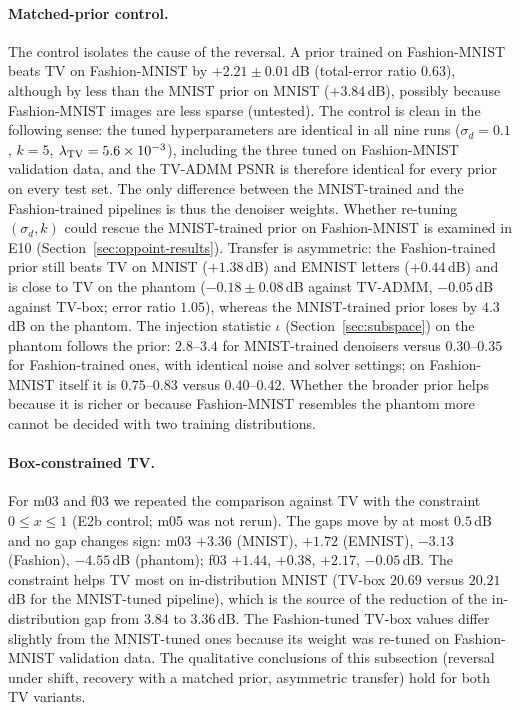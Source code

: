 \paragraph{Matched-prior control.} The control isolates the cause of the reversal. A prior trained on Fashion-MNIST beats TV on
Fashion-MNIST by $+2.21\pm0.01$\,dB (total-error ratio $0.63$), although by less than the MNIST prior on MNIST
($+3.84$\,dB), possibly because Fashion-MNIST images are less sparse (untested). The control is clean in the following sense: the
tuned hyperparameters are identical in all nine runs ($\sigma_d=0.1$, $k=5$, $\lambda_{\rm TV}=5.6\times10^{-3}$), including the three
tuned on Fashion-MNIST validation data, and the TV-ADMM PSNR is therefore identical for every prior on every test set. The
only difference between the MNIST-trained and the Fashion-trained pipelines is thus the denoiser weights. Whether re-tuning $(\sigma_d,k)$ could rescue the MNIST-trained prior on Fashion-MNIST is examined in E10 (Section~\ref{sec:oppoint-results}).
Transfer is asymmetric:
the Fashion-trained prior still beats TV on MNIST ($+1.38$\,dB) and EMNIST letters ($+0.44$\,dB) and is close to TV
on the phantom ($-0.18\pm0.08$\,dB against TV-ADMM, $-0.05$\,dB against TV-box; error ratio $1.05$), whereas the MNIST-trained prior loses by $4.3$\,dB on the phantom.
The injection statistic $\iota$ (Section~\ref{sec:subspace}) on the phantom follows the prior: $2.8$--$3.4$ for MNIST-trained denoisers versus
$0.30$--$0.35$ for Fashion-trained ones, with identical noise and solver settings; on Fashion-MNIST itself it is $0.75$--$0.83$
versus $0.40$--$0.42$. Whether the broader prior helps because it is richer or because Fashion-MNIST resembles the phantom
more cannot be decided with two training distributions.

\paragraph{Box-constrained TV.} For m03 and f03 we repeated the comparison against TV with the constraint $0\le x\le1$
(E2b control; m05 was not rerun). The gaps move by at most $0.5$\,dB and no gap changes sign: m03 $+3.36$ (MNIST), $+1.72$ (EMNIST), $-3.13$ (Fashion), $-4.55$\,dB (phantom); f03 $+1.44$, $+0.38$, $+2.17$,
$-0.05$\,dB. The constraint helps TV most on in-distribution MNIST (TV-box $20.69$ versus $20.21$\,dB for the MNIST-tuned
pipeline), which is the source of the reduction of the in-distribution gap from $3.84$ to $3.36$\,dB. The Fashion-tuned TV-box values differ slightly from the
MNIST-tuned ones because its weight was re-tuned on Fashion-MNIST validation data. The qualitative conclusions of this subsection
(reversal under shift, recovery with a matched prior, asymmetric transfer) hold for both TV variants.

